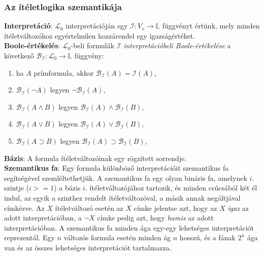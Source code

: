 \documentclass[margin=0px]{article}
\begin{document}
\subsubsection{Az ítéletlogika szemantikája}

\noindent \textbf{Interpretáció}: $\mathcal{L}_{0}$ interpretációján egy $\mathcal{I} : V_{v} \to \mathbb{L}$ függvényt értünk, mely minden ítéletváltozóhoz egyértelműen hozzárendel egy igazságértéket.\\

\noindent \textbf{Boole-értékelés}: $\mathcal{L}_{0}$-beli formulák $\mathcal{I}$ \textit{interpretációbeli Boole-értékelése} a következő $\mathcal{B}_{\mathcal{I}} : \mathcal{L}_{0} \to \mathbb{L}$ függvény:

\begin{enumerate}
    \item ha $A$ prímformula, akkor $\mathcal{B}_{\mathcal{I}}(A) = \mathcal{I}(A)$,

    \item $\mathcal{B}_{\mathcal{I}}(\neg A)$ legyen $\neg \mathcal{B}_{\mathcal{I}}(A) $,

    \item $\mathcal{B}_{\mathcal{I}}(A \wedge B)$ legyen $\mathcal{B}_{\mathcal{I}}(A) \wedge \mathcal{B}_{\mathcal{I}}(B)$,

    \item $\mathcal{B}_{\mathcal{I}}(A \vee B)$ legyen $\mathcal{B}_{\mathcal{I}}(A) \vee \mathcal{B}_{\mathcal{I}}(B)$,

    \item $\mathcal{B}_{\mathcal{I}}(A \supset B)$ legyen $\mathcal{B}_{\mathcal{I}}(A) \supset \mathcal{B}_{\mathcal{I}}(B)$,
\end{enumerate}

\noindent \textbf{Bázis}: A formula ítéletváltozóinak egy rögzített sorrendje.\\

\noindent \textbf{Szemantikus fa}: Egy formula különböző interpretációit szemantikus fa segítségével szemléltethetjük. A szemantikus
fa egy olyan bináris fa, amelynek $i$. szintje ($i>=1$) a bázis $i$. ítéletváltozójához tartozik, és minden csúcsából két él indul, az
egyik a szinthez rendelt ítéletváltozóval, a másik annak negáltjával címkézve. Az $X$ ítéletváltozó esetén az $X$ címke jelentse azt, hogy az $X$ \textit{igaz} az adott interpretációban, a $\neg X$ címke pedig azt, hogy \textit{hamis} az adott interpretációban. A szemantikus fa
minden ága egy-egy lehetséges interpretációt reprezentál. Egy $n$ változós formula esetén minden ág $n$ hosszú, és a fának $2^{n}$ ága van és az összes lehetséges interpretációt tartalmazza.
\end{document}
